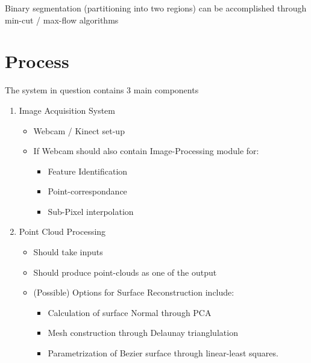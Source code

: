 \documentclass[12pt]{report}
\begin{document}
Binary segmentation (partitioning into two regions) can be accomplished through
min-cut / max-flow algorithms	
\chapter{Process}
The system in question contains 3 main components
\begin{enumerate}
	\item Image Acquisition System
	\begin{itemize}
		\item Webcam / Kinect set-up
		\item If Webcam should also contain Image-Processing module for:
		\begin{itemize}
			\item Feature Identification
			\item Point-correspondance
			\item Sub-Pixel interpolation
		\end{itemize}
	\end{itemize}
	\item Point Cloud Processing
	\begin{itemize}
		\item Should take inputs
		\item Should produce point-clouds as one of the output
		\item (Possible) Options for Surface Reconstruction include:
		\begin{itemize}
			\item Calculation of surface Normal through PCA
			\item Mesh construction through Delaunay trianglulation
			\item Parametrization of Bezier surface through linear-least squares.
		\end{itemize}

	\end{itemize}

\end{enumerate}

\begin{equation*}
\end{equation*}


%
\end{document}
